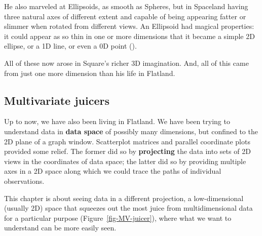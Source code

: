 \documentclass[
  letterpaper,
  10pt,
  krantz2]{krantz}
\begin{document}
{He also marveled at Ellipsoids, as smooth as Spheres, but in Spaceland
having three natural axes of different extent and capable of being
appearing fatter or slimmer when rotated from different views. An
Ellipsoid had magical properties: it could appear as so thin in one or
more dimensions that it became a simple 2D ellipse, or a 1D line, or
even a 0D point ().

All of these now arose in Square's richer 3D imagination. And, all of
this came from just one more dimension than his life in Flatland.

\subsection{Multivariate juicers}\label{multivariate-juicers}

Up to now, we have also been living in Flatland. We have been trying to
understand data in \textbf{data space} of possibly many dimensions, but
confined to the 2D plane of a graph window. Scatterplot matrices and
parallel coordinate plots provided some relief. The former did so by
\textbf{projecting} the data into sets of 2D views in the coordinates of
data space; the latter did so by providing multiple axes in a 2D space
along which we could trace the paths of individual observations.

This chapter is about seeing data in a different projection, a
low-dimensional (usually 2D) space that squeezes out the most juice from
multidimensional data for a particular purpose
(Figure~\ref{fig-MV-juicer}), where what we want to understand can be
more easily seen.

\begin{figure}

\end{figure}}
\end{document}
